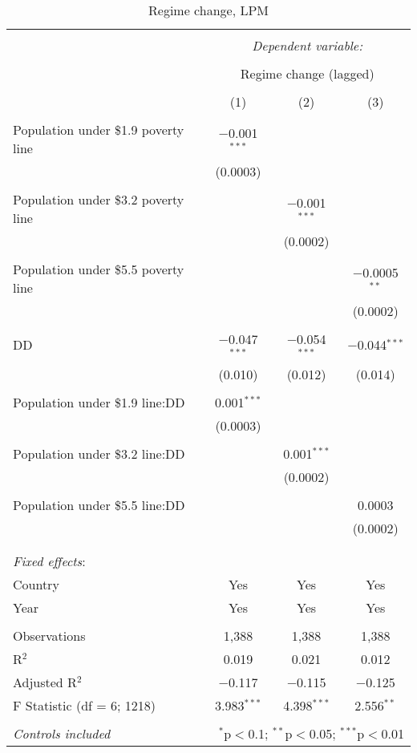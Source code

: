 \documentclass[a4paper, 12pt]{article}
\begin{document}
   \begin{table}[!htbp] \centering 
  \caption{Regime change, LPM} 
  \label{lpmrc} 
\begin{tabular}{@{\extracolsep{5pt}}lccc} 
\\[-1.8ex]\hline 
\hline \\[-1.8ex] 
 & \multicolumn{3}{c}{\textit{Dependent variable:}} \\ 
\cline{2-4} 
\\[-1.8ex] & \multicolumn{3}{c}{Regime change (lagged)} \\ 
\\[-1.8ex] & (1) & (2) & (3)\\ 
\hline \\[-1.8ex] 
 Population under \$1.9 poverty line & $-$0.001$^{***}$ &  &  \\ 
  & (0.0003) &  &  \\ 
  & & & \\ 
 Population under \$3.2 poverty line &  & $-$0.001$^{***}$ &  \\ 
  &  & (0.0002) &  \\ 
  & & & \\ 
 Population under \$5.5 poverty line &  &  & $-$0.0005$^{**}$ \\ 
  &  &  & (0.0002) \\ 
  & & & \\ 
 DD & $-$0.047$^{***}$ & $-$0.054$^{***}$ & $-$0.044$^{***}$ \\ 
  & (0.010) & (0.012) & (0.014) \\ 
  & & & \\ 
 Population under \$1.9 line:DD & 0.001$^{***}$ &  &  \\ 
  & (0.0003) &  &  \\ 
  & & & \\ 
 Population under \$3.2 line:DD &  & 0.001$^{***}$ &  \\ 
  &  & (0.0002) &  \\ 
  & & & \\ 
 Population under \$5.5 line:DD &  &  & 0.0003 \\ 
  &  &  & (0.0002) \\ 
  & & & \\ 
    \hline \\[-1.8ex] 
 \textit{Fixed effects}:\\
Country & Yes & Yes & Yes\\
Year & Yes & Yes & Yes \\
\hline \\[-1.8ex] 
Observations & 1,388 & 1,388 & 1,388 \\ 
R$^{2}$ & 0.019 & 0.021 & 0.012 \\ 
Adjusted R$^{2}$ & $-$0.117 & $-$0.115 & $-$0.125 \\ 
F Statistic (df = 6; 1218) & 3.983$^{***}$ & 4.398$^{***}$ & 2.556$^{**}$ \\ 
\hline 
\hline \\[-1.8ex] 
\textit{Controls included}  & \multicolumn{3}{r}{$^{*}$p$<$0.1; $^{**}$p$<$0.05; $^{***}$p$<$0.01} \\ 
\end{tabular}
\end{table}
    
\end{document}
